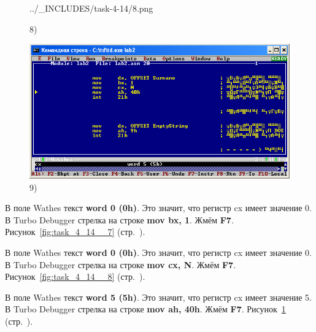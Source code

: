 \begin{figure}[!htp]
\begin {minipage}{0.32\textwidth}
            {../_INCLUDES/task-4-14/8.png}
        \caption{8) }
        \label{fig:task_4_14__8}
    \end{minipage}
    \begin {minipage}{0.32\textwidth}
        \centering
        \includegraphics[width=.99\linewidth]
            {../_INCLUDES/task-4-14/9.png}
        \caption{9) }
        \label{fig:task_4_14__9}
    \end{minipage}
\end{figure}

В поле Wathes текст \textbf{word 0 (0h)}.
Это значит, что регистр cx имеет значение 0.
В Turbo Debugger стрелка на строке \textbf{mov bx, 1}.
Жмём \textbf{F7}.
Рисунок~\ref{fig:task_4_14__7} (стр.~\pageref{fig:task_4_14__7}).


В поле Wathes текст \textbf{word 0 (0h)}.
Это значит, что регистр cx имеет значение 0.
В Turbo Debugger стрелка на строке \textbf{mov cx, N}.
Жмём \textbf{F7}. 
Рисунок~\ref{fig:task_4_14__8} (стр.~\pageref{fig:task_4_14__8}).

В поле Wathes текст \textbf{word 5 (5h)}.
Это значит, что регистр cx имеет значение 5.
В Turbo Debugger стрелка на строке \textbf{mov ah, 40h}.
Жмём \textbf{F7}. 
Рисунок~\ref{fig:task_4_14__9} (стр.~\pageref{fig:task_4_14__9}).

